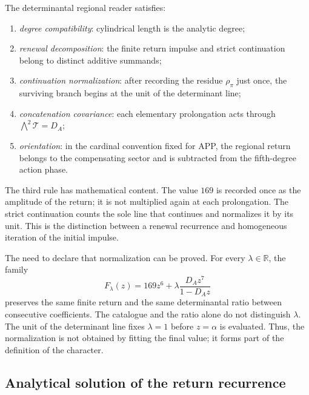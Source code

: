 \begin{definition}
\label{p3-83-c30-s1:def:lector-regional-determinantal}
The determinantal regional reader satisfies:
\begin{enumerate}
  \item \emph{degree compatibility}: cylindrical length is the analytic
  degree;
  \item \emph{renewal decomposition}: the finite return impulse and
  strict continuation belong to distinct additive summands;
  \item \emph{continuation normalization}: after recording the residue
  \(\rho_\pi\) just once, the surviving branch begins at the unit of
  the determinant line;
  \item \emph{concatenation covariance}: each elementary prolongation
  acts through \(\bigwedge^2\mathcal T=D_A\);
  \item \emph{orientation}: in the cardinal convention fixed for APP, the
  regional return belongs to the compensating sector and is subtracted from the fifth-degree
action phase.
\end{enumerate}
\end{definition}

The third rule has mathematical content. The value \(169\) is recorded once as the amplitude of the return; it is not multiplied again at each prolongation. The strict continuation counts the sole line that continues and normalizes it by its unit. This is the distinction between a renewal recurrence and homogeneous iteration of the initial impulse.

The need to declare that normalization can be proved. For every
\(\lambda\in\mathbb R\), the family
\[
F_\lambda(z)
=169z^6+\lambda\frac{D_Az^7}{1-D_Az}
\]
preserves the same finite return and the same determinantal ratio between
consecutive coefficients. The catalogue and the ratio alone do not distinguish
\(\lambda\). The unit of the determinant line fixes
\(\lambda=1\) before \(z=\alpha\) is evaluated. Thus, the normalization
is not obtained by fitting the final value; it forms part of the definition of the
character.

\subsection{Analytical solution of the return recurrence}
\label{sec:s102:c38:2:4}


